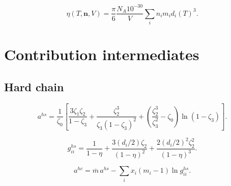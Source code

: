 \documentclass[11pt]{article}
\begin{document}
\begin{equation}
\eta(T,\boldsymbol{n},V)=
\frac{\pi}{6}\frac{N_A10^{-30}}{V}\sum_i n_i m_i d_i(T)^3.
\label{eq:phase_packing_fraction}
\end{equation}

\section{Contribution intermediates}

\subsection{Hard chain}

\begin{equation}
a^{hs}=\frac{1}{\zeta_0}\left[
\frac{3\zeta_1\zeta_2}{1-\zeta_3}
+\frac{\zeta_2^3}{\zeta_3(1-\zeta_3)^2}
+\left(\frac{\zeta_2^3}{\zeta_3^2}-\zeta_0\right)
\ln(1-\zeta_3)\right].
\label{eq:hard_sphere_helmholtz}
\end{equation}

\begin{equation}
g_{ii}^{hs}=
\frac{1}{1-\eta}
+\frac{3(d_i/2)\zeta_2}{(1-\eta)^2}
+\frac{2(d_i/2)^2\zeta_2^2}{(1-\eta)^3}.
\label{eq:hard_sphere_contact}
\end{equation}

\begin{equation}
a^{hc}=\overline{m}\,a^{hs}
-\sum_i x_i(m_i-1)\ln g_{ii}^{hs}.
\label{eq:hard_chain_helmholtz}
\end{equation}
\end{document}
